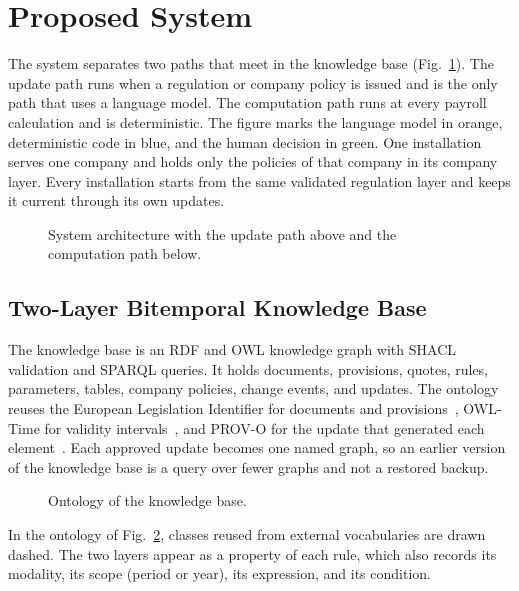 \section{Proposed System}
\label{sec:system}
The system separates two paths that meet in the knowledge base (Fig.~\ref{fig:architecture}). The update path runs when a regulation or company policy is issued and is the only path that uses a language model. The computation path runs at every payroll calculation and is deterministic. The figure marks the language model in orange, deterministic code in blue, and the human decision in green. One installation serves one company and holds only the policies of that company in its company layer. Every installation starts from the same validated regulation layer and keeps it current through its own updates.

\begin{figure}[!t]
\centering
\figArchitecture
\caption{System architecture with the update path above and the computation path below.}
\label{fig:architecture}
\end{figure}

\subsection{Two-Layer Bitemporal Knowledge Base}
\label{sec:representation}
The knowledge base is an RDF and OWL knowledge graph with SHACL validation and SPARQL queries. It holds documents, provisions, quotes, rules, parameters, tables, company policies, change events, and updates. The ontology reuses the European Legislation Identifier for documents and provisions~\cite{publicationsoffice2026elien}, OWL-Time for validity intervals~\cite{cox2017owltime}, and PROV-O for the update that generated each element~\cite{lebo2013provo}. Each approved update becomes one named graph, so an earlier version of the knowledge base is a query over fewer graphs and not a restored backup.

\begin{figure}[!t]
\centering
\resizebox{0.95\textwidth}{!}{}
\caption{Ontology of the knowledge base.}
\label{fig:ontology}
\end{figure}

In the ontology of Fig.~\ref{fig:ontology}, classes reused from external vocabularies are drawn dashed. The two layers appear as a property of each rule, which also records its modality, its scope (period or year), its expression, and its condition.

